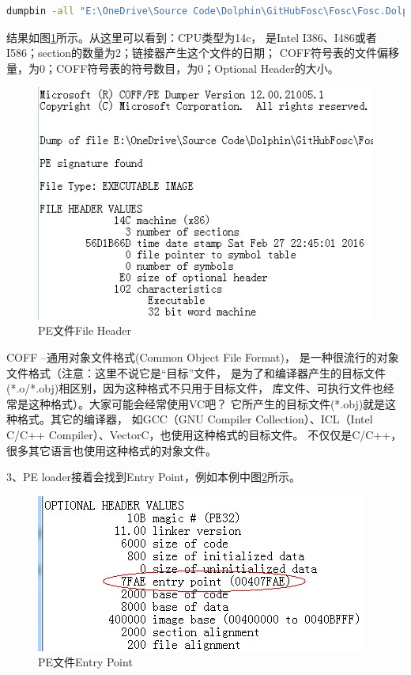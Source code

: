 \documentclass{book}
\begin{document}
\begin{lstlisting}[language=Bash]
dumpbin -all "E:\OneDrive\Source Code\Dolphin\GitHubFosc\Fosc\Fosc.Dolphin.UI\Fosc.Dolphin.UI\bin\x64\Debug\Fosc.Dolphin.UI.exe" >>C:\dump.txt
\end{lstlisting}

结果如图\ref{fig:DumpbinToCheckPEHeader}所示。从这里可以看到：CPU类型为14c，
是Intel I386、I486或者I586；section的数量为2；链接器产生这个文件的日期；
COFF符号表的文件偏移量，为0；COFF符号表的符号数目，为0；Optional Header的大小。

\begin{figure}[htbp]
	\centering
	\includegraphics[scale=0.8]{DumpbinToCheckPEHeader.jpg}
	\caption{PE文件File Header}
	\label{fig:DumpbinToCheckPEHeader}
\end{figure}

COFF –通用对象文件格式(Common Object File Format)，
是一种很流行的对象文件格式（注意：这里不说它是“目标”文件，
是为了和编译器产生的目标文件(*.o/*.obj)相区别，因为这种格式不只用于目标文件，
库文件、可执行文件也经常是这种格式）。大家可能会经常使用VC吧？
它所产生的目标文件(*.obj)就是这种格式。其它的编译器，
如GCC（GNU Compiler Collection）、ICL（Intel C/C++ Compiler）、VectorC，也使用这种格式的目标文件。
不仅仅是C/C++，很多其它语言也使用这种格式的对象文件。

3、PE loader接着会找到Entry Point，例如本例中图\ref{fig:PEFileEntryPoint}所示。

\begin{figure}[htbp]
	\centering
	\includegraphics[scale=0.8]{PEFileEntryPoint.jpg}
	\caption{PE文件Entry Point}
	\label{fig:PEFileEntryPoint}
\end{figure}
\end{document}
